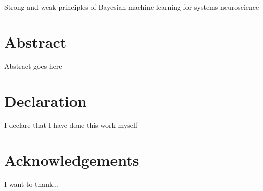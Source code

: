 \documentclass[openany]{book}
\begin{document}
{\centering \Large Strong and weak principles of Bayesian machine learning for systems neuroscience}

\chapter*{Abstract}
Abstract goes here

\chapter*{Declaration}
I declare that I have done this work myself

\chapter*{Acknowledgements}
I want to thank...

\tableofcontents












\appendix


\end{document}

